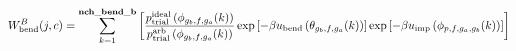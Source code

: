 \documentclass[12pt]{article}
\begin{document}
\begin{displaymath}
W_{\rm bend}^{B}(j,c) =
\sum_{k=1}^{\bf nch\_bend\_b}
\left[
{{p_{\rm trial}^{\rm ideal}\left(\phi_{g_b,f,g_a}(k)\right)}\over{ p_{\rm trial}^{\rm arb}\left(\phi_{g_b,f,g_a}(k)\right)}}
\exp\left[-\beta u_{\rm bend}\left(\theta_{g_b,f,g_a}(k)\right)\right]
\exp\left[-\beta u_{\rm imp}\left(\phi_{p,f,g_a,g_b}(k)\right)\right]
\right]
\end{displaymath}
\end{document}
